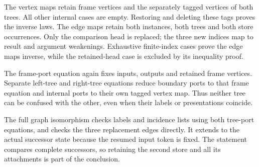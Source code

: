 

The vertex maps retain frame vertices and the separately tagged vertices
of both trees. All other internal cases are empty. Restoring and deleting
these tags proves the inverse laws. The edge maps retain both instances,
both trees and both store occurrences. Only the comparison head is replaced;
the three new indices map to result and argument weakenings. Exhaustive
finite-index cases prove the edge maps inverse, while the retained-head
case is excluded by its inequality proof.







The frame-port equation again fixes inputs, outputs and retained frame
vertices. Separate left-tree and right-tree equations reduce boundary ports
to that frame equation and internal ports to their own tagged vertex map.
Thus neither tree can be confused with the other, even when their labels
or presentations coincide.




The full graph isomorphism checks labels and incidence lists using both
tree-port equations, and checks the three replacement edges directly.
It extends to the actual successor state because the resumed input token
is fixed. The statement compares complete successors, so retaining the
second store and all its attachments is part of the conclusion.

